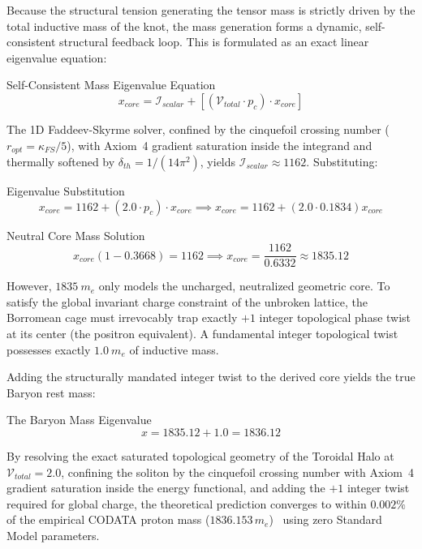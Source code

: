 Because the structural tension generating the tensor mass is strictly driven by the total inductive mass of the knot, the mass generation forms a dynamic, self-consistent structural feedback loop. This is formulated as an exact linear eigenvalue equation:
\begin{resultbox}{Self-Consistent Mass Eigenvalue Equation}
\begin{equation}
x_{core} = \mathcal{I}_{scalar} + \left[ (\mathcal{V}_{total} \cdot p_c) \cdot x_{core} \right]
\end{equation}
\end{resultbox}

The 1D Faddeev-Skyrme solver, confined by the cinquefoil crossing number ($r_{opt} = \kappa_{FS}/5$), with Axiom~4 gradient saturation inside the integrand and thermally softened by $\delta_{th} = 1/(14\pi^2)$, yields $\mathcal{I}_{scalar} \approx 1162$. Substituting:
\begin{resultbox}{Eigenvalue Substitution}
\begin{equation}
x_{core} = 1162 + (2.0 \cdot p_c) \cdot x_{core} \implies x_{core} = 1162 + (2.0 \cdot 0.1834) x_{core}
\end{equation}
\end{resultbox}
\begin{resultbox}{Neutral Core Mass Solution}
\begin{equation}
x_{core}(1 - 0.3668) = 1162 \implies x_{core} = \frac{1162}{0.6332} \approx \mathbf{1835.12}
\end{equation}
\end{resultbox}

However, $1835\ m_e$ only models the uncharged, neutralized geometric core. To satisfy the global invariant charge constraint of the unbroken lattice, the Borromean cage must irrevocably trap exactly $+1$ integer topological phase twist at its center (the positron equivalent). A fundamental integer topological twist possesses exactly $1.0\ m_e$ of inductive mass. 

Adding the structurally mandated integer twist to the derived core yields the true Baryon rest mass:
\begin{resultbox}{The Baryon Mass Eigenvalue}
\begin{equation}
x = 1835.12 + 1.0 = \mathbf{1836.12}
\end{equation}
\end{resultbox}

By resolving the exact saturated topological geometry of the Toroidal Halo at $\mathcal{V}_{total}=2.0$, confining the soliton by the cinquefoil crossing number with Axiom~4 gradient saturation inside the energy functional, and adding the $+1$ integer twist required for global charge, the theoretical prediction converges to within $\mathbf{0.002\%}$ of the empirical CODATA proton mass ($1836.153\,m_e$)~\cite{codata2018} using zero Standard Model parameters.

